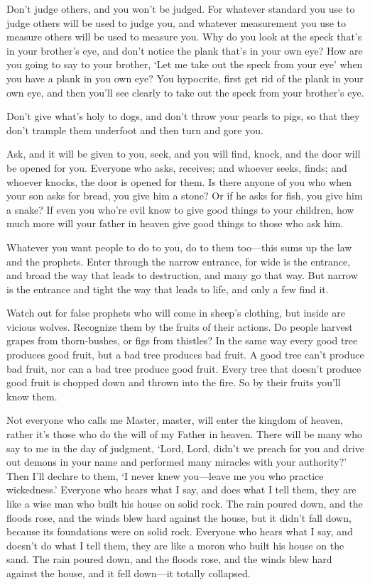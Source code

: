 \documentclass[a4paper]{amsbook}
\begin{document}
Don't judge others, and you won't be judged. For whatever standard you use to judge others will be used to judge you, and whatever measurement you use to measure others will be used to measure you. Why do you look at the speck that's in your brother's eye, and don't notice the plank that's in your own eye? How are you going to say to your brother, ‘Let me take out the speck from your eye' when you have a plank in you own eye? You hypocrite, first get rid of the plank in your own eye, and then you'll see clearly to take out the speck from your brother's eye.

Don't give what's holy to dogs, and don't throw your pearls to pigs, so that they don't trample them underfoot and then turn and gore you.

Ask, and it will be given to you, seek, and you will find, knock, and the door will be opened for you. Everyone who asks, receives; and whoever seeks, finds; and whoever knocks, the door is opened for them. Is there anyone of you who when your son asks for bread, you give him a stone? Or if he asks for fish, you give him a snake? If even you who're evil know to give good things to your children, how much more will your father in heaven give good things to those who ask him.

Whatever you want people to do to you, do to them too—this sums up the law and the prophets. Enter through the narrow entrance, for wide is the entrance, and broad the way that leads to destruction, and many go that way. But narrow is the entrance and tight the way that leads to life, and only a few find it.

Watch out for false prophets who will come in sheep's clothing, but inside are vicious wolves. Recognize them by the fruits of their actions. Do people harvest grapes from thorn-bushes, or figs from thistles? In the same way every good tree produces good fruit, but a bad tree produces bad fruit. A good tree can't produce bad fruit, nor can a bad tree produce good fruit. Every tree that doesn't produce good fruit is chopped down and thrown into the fire. So by their fruits you'll know them.

Not everyone who calls me Master, master, will enter the kingdom of heaven, rather it's those who do the will of my Father in heaven. There will be many who say to me in the day of judgment, ‘Lord, Lord, didn't we preach for you and drive out demons in your name and performed many miracles with your authority?' Then I'll declare to them, ‘I never knew you—leave me you who practice wickedness.' Everyone who hears what I say, and does what I tell them, they are like a wise man who built his house on solid rock. The rain poured down, and the floods rose, and the winds blew hard against the house, but it didn't fall down, because its foundations were on solid rock. Everyone who hears what I say, and doesn't do what I tell them, they are like a moron who built his house on the sand. The rain poured down, and the floods rose, and the winds blew hard against the house, and it fell down—it totally collapsed.
\end{document}
